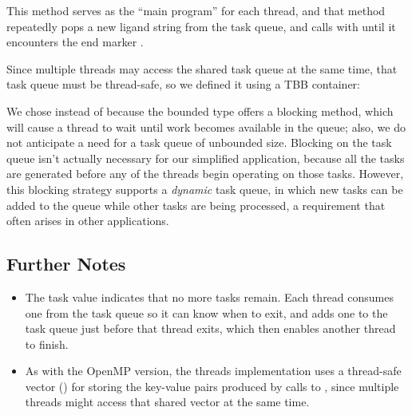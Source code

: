 \documentclass[letterpaper,10pt,openany,oneside]{sphinxmanual}
\begin{document}
This method  serves as the “main program” for each thread, and that method repeatedly pops a new ligand string  from the task queue, and calls  with  until it encounters the end marker .

Since multiple threads may access the shared task queue  at the same time, that task queue must be thread-safe, so we defined it using a TBB container:
\begin{quote}

\end{quote}

We chose  instead of  because the bounded type offers a blocking  method, which will cause a thread to wait until work becomes available in the queue; also, we do not anticipate a need for a task queue of unbounded size. Blocking on the task queue isn’t actually necessary for our simplified application, because all the tasks are generated before any of the threads begin operating on those tasks. However, this blocking strategy supports a \emph{dynamic} task queue, in which new tasks can be added to the queue while other tasks are being processed, a requirement that often arises in other applications.


\subsection{Further Notes}
\label{c++11threads/c++11threads:further-notes}\begin{itemize}
\item {} 
The  task value indicates that no more tasks remain. Each thread consumes one  from the task queue so it can know when to exit, and adds one  to the task queue just before that thread exits, which then enables another thread to finish.

\item {} 
As with the OpenMP version, the  threads implementation uses a thread-safe vector () for storing the key-value pairs produced by calls to , since multiple threads might access that shared vector at the same time.

\end{itemize}
\end{document}
